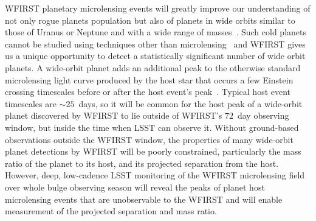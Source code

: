 WFIRST planetary microlensing events will greatly improve our
understanding of not only rogue planets population but also of planets in wide orbits similar to those of
Uranus or Neptune and with a wide range of masses~\citep{2015arXiv150303757S}. Such cold planets
cannot be studied using techniques other than microlensing~\citep[e.g.,][]{2012ARAA..50..411G} and
WFIRST gives us a unique opportunity to detect a statistically significant
number of wide orbit planets.
A wide-orbit planet adds an additional peak to the otherwise
standard microlensing light curve produced by the host star that occurs a few Einstein crossing timescales before or after the host event's peak~\citep[e.g.,][]{2014ApJ...795...42P}. Typical host event timescales are ${\sim}25$~days, so it will be common for the host peak of a wide-orbit planet discovered by WFIRST to lie outside of WFIRST's $72$~day observing window, but inside the time when LSST can observe it. Without ground-based observations outside the WFIRST window, the properties of many wide-orbit planet detections by WFIRST will be poorly constrained, particularly the mass ratio of the planet to its host, and its projected separation from the host. However, deep, low-cadence LSST
monitoring of the WFIRST microlensing field over whole bulge observing season
will reveal the peaks of planet host microlensing events that are unobservable
to the WFIRST and will enable measurement of the projected separation and mass ratio.



